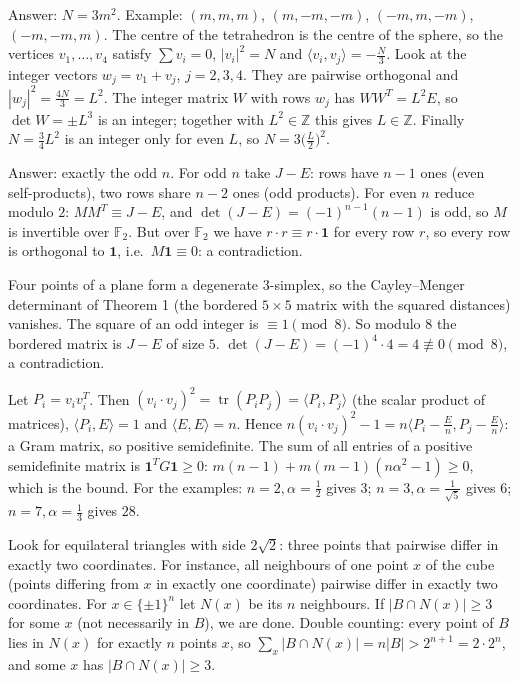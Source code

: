 \documentclass[11pt,a4paper]{article}
\begin{document}
 Answer: $N=3m^2$. Example: $(m,m,m)$, $(m,-m,-m)$, $(-m,m,-m)$, $(-m,-m,m)$.
 The centre of the tetrahedron is the centre of the sphere, so the vertices $v_1,\dots,v_4$ satisfy $\sum v_i=0$, $|v_i|^2=N$ and $\langle v_i,v_j\rangle=-\frac N3$. Look at the integer vectors $w_j=v_1+v_j$, $j=2,3,4$.
 They are pairwise orthogonal and $|w_j|^2=\frac{4N}3=L^2$. The integer matrix $W$ with rows $w_j$ has $WW^T=L^2E$, so $\det W=\pm L^3$ is an integer; together with $L^2\in\mathbb Z$ this gives $L\in\mathbb Z$. Finally $N=\frac34L^2$ is an integer only for even $L$, so $N=3\bigl(\frac L2\bigr)^2$.

 Answer: exactly the odd $n$. For odd $n$ take $J-E$: rows have $n-1$ ones (even self-products), two rows share $n-2$ ones (odd products).
 For even $n$ reduce modulo $2$: $MM^T\equiv J-E$, and $\det(J-E)=(-1)^{n-1}(n-1)$ is odd, so $M$ is invertible over $\mathbb F_2$.
 But over $\mathbb F_2$ we have $r\cdot r\equiv r\cdot\mathbf1$ for every row $r$, so every row is orthogonal to $\mathbf1$, i.e.\ $M\mathbf1\equiv0$: a contradiction.

 Four points of a plane form a degenerate $3$-simplex, so the Cayley--Menger determinant of Theorem 1 (the bordered $5\times5$ matrix with the squared distances) vanishes.
 The square of an odd integer is $\equiv1\pmod8$. So modulo $8$ the bordered matrix is $J-E$ of size $5$.
 $\det(J-E)=(-1)^4\cdot4=4\not\equiv0\pmod8$, a contradiction.

 Let $P_i=v_iv_i^T$. Then $(v_i\cdot v_j)^2=\operatorname{tr}(P_iP_j)=\langle P_i,P_j\rangle$ (the scalar product of matrices), $\langle P_i,E\rangle=1$ and $\langle E,E\rangle=n$.
 Hence $n(v_i\cdot v_j)^2-1=n\bigl\langle P_i-\frac En,P_j-\frac En\bigr\rangle$: a Gram matrix, so positive semidefinite.
 The sum of all entries of a positive semidefinite matrix is $\mathbf1^TG\mathbf1\ge0$: $m(n-1)+m(m-1)(n\alpha^2-1)\ge0$, which is the bound. For the examples: $n=2,\alpha=\frac12$ gives $3$; $n=3,\alpha=\frac1{\sqrt5}$ gives $6$; $n=7,\alpha=\frac13$ gives $28$.

 Look for equilateral triangles with side $2\sqrt2$: three points that pairwise differ in exactly two coordinates. For instance, all neighbours of one point $x$ of the cube (points differing from $x$ in exactly one coordinate) pairwise differ in exactly two coordinates.
 For $x\in\{\pm1\}^n$ let $N(x)$ be its $n$ neighbours. If $|B\cap N(x)|\ge3$ for some $x$ (not necessarily in $B$), we are done.
 Double counting: every point of $B$ lies in $N(x)$ for exactly $n$ points $x$, so $\sum_x|B\cap N(x)|=n|B|>2^{n+1}=2\cdot2^n$, and some $x$ has $|B\cap N(x)|\ge3$.
\end{document}

